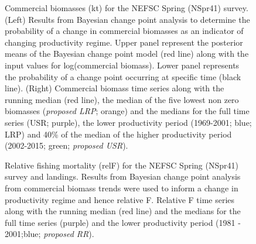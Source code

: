\documentclass[11pt]{article}
\newcommand{\e}{/backup/bio_data/bio.lobster/figures/} %
\begin{document}
\begin{landscape}
\begin{figure}
\centering
       \caption{Commercial biomasses (kt) for the NEFSC Spring (NSpr41) survey. (Left) Results from Bayesian change point analysis to determine the probability of a change in commercial biomasses as an indicator of changing productivity regime. Upper panel represent the posterior means of the Bayesian change point model (red line) along with the input values for log(commercial biomass). Lower panel represents the probability of a change point occurring at specific time (black line). (Right) Commercial biomass time series along with the running median (red line), the median of the five lowest non zero biomasses (\emph{proposed LRP}; orange) and the medians for the full time series (USR; purple), the lower productivity period (1969-2001; blue; LRP) and 40\% of the median of the higher productivity period (2002-2015; green; \emph{proposed USR}). }

\end{figure}
\end{landscape}
     \clearpage


\begin{figure}
\centering
       \caption{Relative fishing mortality (relF) for the NEFSC Spring (NSpr41) survey and landings. Results from Bayesian change point analysis from commercial biomass trends were used to inform a change in productivity regime and hence relative F. Relative F time series along with the running median (red line) and the medians for the full time series (purple) and the lower productivity period (1981 - 2001;blue; \emph{proposed RR}). }
\end{figure}
\end{document}
